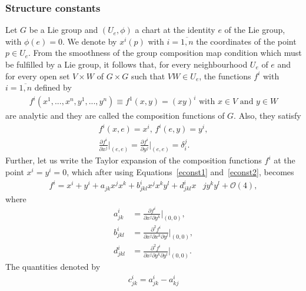 \documentclass[12pt,a4paper]{report}
\theoremstyle{definition}
\theoremstyle{remark}
\theoremstyle{remark}
\begin{document}
\subsubsection{Structure constants}
Let $G$ be a Lie group and $(U_e,\phi)$ a chart at  the identity $e$ of the Lie group, with $\phi(e)=0$. We denote by $x^i(p)$ with $i=\overline{1,n}$ the coordinates of the point $p\in U_e$. From the smoothness of the group composition map condition which must be fulfilled by a Lie group, it follows that, for every neighbourhood $U_e$ of $e$ and for every open set $V\times W$ of $G\times G$ such that $VW\in U_e$, the functions $f^i$ with $i=\overline{1,n}$ defined by
\begin{equation}\label{econst1}
\begin{aligned}
f^i(x^1,...,x^n,y^1,...,y^n)\equiv f^1(x,y)=(xy)^i \text{ with }x\in V \text{ and }y\in W
\end{aligned}
\end{equation}
are analytic and they are called the composition functions of $G$. Also, they satisfy
\begin{equation}\label{econst2}
\begin{aligned}
f^i(x,e)=x^i\text{, } f^i(e,y)=y^i,\\
\frac{\partial f^i}{\partial x^j}\bigg\rvert_{(e,e)}=\frac{\partial f^i}{\partial y^j}\bigg\rvert_{(e,e)}=\delta_i^j.
\end{aligned}
\end{equation}
\indent Further, let us write the Taylor expansion of the composition functions $f^i$ at the point $x^i=y^i=0$, which after using Equations~\ref{econst1} and~\ref{econst2}, becomes
\begin{align*}
f^i=x^i+y^i+a_{jk}x^jx^k+b_{jkl}^ix^jx^ky^l+d_{jkl}^ix&jy^ky^l+\mathcal{O}(4),
\end{align*}
where
\begin{align*}
a_{jk}^i&=\frac{\partial f^i}{\partial x^j\partial y^k}\bigg\rvert_{(0,0)},\\
b_{jkl}^i&=\frac{\partial^2 f^i}{\partial x^j\partial x^k \partial y^l}\bigg\rvert_{(0,0)},\\
d_{jkl}^i&=\frac{\partial^2 f^i}{\partial x^j\partial y^k \partial y^l}\bigg\rvert_{(0,0)}.
\end{align*}
The quantities denoted by
\begin{equation}\label{econst3}
\begin{aligned}
c_{jk}^i=a_{jk}^i-a_{kj}^i
\end{aligned}
\end{equation}
\end{document}
